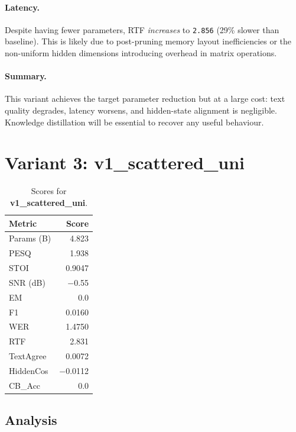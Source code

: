 \documentclass[11pt,a4paper]{article}
\newcommand{\scoreval}[1]{\texttt{#1}}
\begin{document}
\paragraph{Latency.}
Despite having fewer parameters, RTF \emph{increases} to \scoreval{2.856} (29\% slower than baseline). This is likely due to post-pruning memory layout inefficiencies or the non-uniform hidden dimensions introducing overhead in matrix operations.

\paragraph{Summary.}
This variant achieves the target parameter reduction but at a large cost: text quality degrades, latency worsens, and hidden-state alignment is negligible. Knowledge distillation will be essential to recover any useful behaviour.

\newpage
\section{Variant 3: v1\_scattered\_uni}

\begin{table}[H]
\centering
\caption{Scores for \textbf{v1\_scattered\_uni}.}
\begin{tabular}{l r}
\toprule
\textbf{Metric} & \textbf{Score} \\
\midrule
Params (B)    & 4.823 \\
PESQ          & 1.938 \\
STOI          & 0.9047 \\
SNR (dB)      & $-$0.55 \\
EM            & 0.0 \\
F1            & 0.0160 \\
WER           & 1.4750 \\
RTF           & 2.831 \\
TextAgree     & 0.0072 \\
HiddenCos     & $-$0.0112 \\
CB\_Acc       & 0.0 \\
\bottomrule
\end{tabular}
\end{table}

\subsection{Analysis}
\end{document}
